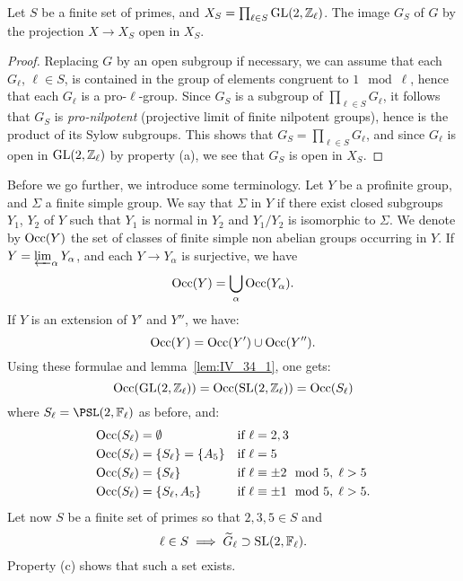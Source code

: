 \begin{lem}\label{lem:IV_34_4}
	Let $S$ be a finite set of primes, and $X_S = \prod_{\ell\in S} \operatorname{GL}(2,
	\mathbb{Z}_\ell)$.
	The image $G_S$ of $G$ by the projection $X \to X_S$ open in $X_S$.
\end{lem}
\begin{proof}
	Replacing $G$ by an open subgroup if necessary, we can assume that each
	$G_\ell$, $\ell \in S$, is contained in the group of elements congruent
	to $1 \mod{\ell}$, hence that each $G_\ell$ is a pro-$\ell$-group.
	Since $G_S$ is a subgroup of $\prod_{\ell \in S} G_\ell$, it follows
	that $G_S$ is \emph{pro-nilpotent} (projective limit of finite
	nilpotent groups), hence is the product of its Sylow subgroups. This
	shows that $G_S = \prod_{\ell\in S} G_\ell$, and since $G_\ell$ is
	\dpage
	open in $\operatorname{GL}(2, \mathbb{Z}_\ell)$ by property (a), we see that $G_S$ is open in
	$X_S$.
\end{proof}

Before we go further, we introduce some terminology. Let $Y$ be a profinite
group, and $\Sigma$ a finite simple group. We say that $\Sigma$ 
in $Y$ if there exist closed subgroups $Y_1$, $Y_2$ of $Y$ such that $Y_1$ is
normal in $Y_2$ and $Y_1/Y_2$ is isomorphic to $\Sigma$. We denote by
$\operatorname{Occ}(Y)$ the set of classes of finite simple non abelian groups
occurring in $Y$. If $Y = \varprojlim_\alpha Y_\alpha$, and each $Y \to Y_\alpha$
is surjective, we have
\[
	\operatorname{Occ}(Y) = \bigcup_{\alpha} \operatorname{Occ}(Y_\alpha).
\]
If $Y$ is an extension of $Y'$ and $Y''$, we have:
\[
	\operatorname{Occ}(Y) = \operatorname{Occ}(Y')\cup \operatorname{Occ}(Y'').
\]
Using these formulae and lemma~\ref{lem:IV_34_1}, one gets:
\[
	\operatorname{Occ}(\operatorname{GL}(2, \mathbb{Z}_\ell)) = \operatorname{Occ}(\operatorname{SL}(2, \mathbb{Z}_\ell)) = \operatorname{Occ}(S_\ell)
\]
where $S_\ell = \PSL(2, \F_\ell)$ as before, and:
\begin{align*}
	\operatorname{Occ}(S_\ell) &= \emptyset                && \text{if } \ell = 2,3 \\
	\operatorname{Occ}(S_\ell) &= \{ S_\ell \} = \{ A_5 \} && \text{if } \ell = 5 \\
	\operatorname{Occ}(S_\ell) &= \{ S_\ell \}             && \text{if } \ell \equiv \pm 2 \mod 5, \; \ell > 5 \\
	\operatorname{Occ}(S_\ell) &= \{ S_\ell, A_5 \}        && \text{if } \ell \equiv \pm 1 \mod 5, \; \ell > 5.
\end{align*}
Let now $S$ be a finite set of primes so that $2, 3, 5 \in S$ and
\dpage
\[
	\ell \in S \implies \widetilde{G}_\ell \supset \operatorname{SL}(2, \mathbb{F}_\ell).
\]
Property (c) shows that such a set exists.

